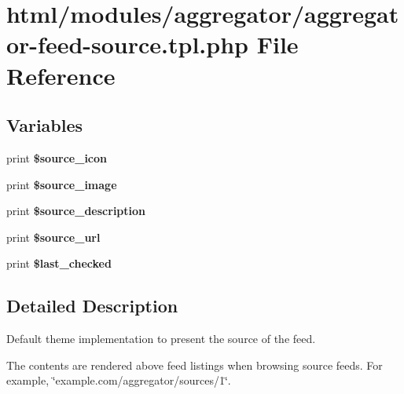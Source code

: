 \hypertarget{aggregator-feed-source_8tpl_8php}{
\section{html/modules/aggregator/aggregator-\/feed-\/source.tpl.php File Reference}
\label{aggregator-feed-source_8tpl_8php}
}
\subsection*{Variables}
\begin{DoxyCompactItemize}
\item 
\hypertarget{aggregator-feed-source_8tpl_8php_ab68bdd58de0c58b7f693392cdaedd0c6}{
print {\bfseries \$source\_\-icon}}
\label{aggregator-feed-source_8tpl_8php_ab68bdd58de0c58b7f693392cdaedd0c6}

\item 
\hypertarget{aggregator-feed-source_8tpl_8php_af295e6279c4277c20165af3ddd0a49fd}{
print {\bfseries \$source\_\-image}}
\label{aggregator-feed-source_8tpl_8php_af295e6279c4277c20165af3ddd0a49fd}

\item 
\hypertarget{aggregator-feed-source_8tpl_8php_a88d3fc892cda0ae2d9785aa1baa64a53}{
print {\bfseries \$source\_\-description}}
\label{aggregator-feed-source_8tpl_8php_a88d3fc892cda0ae2d9785aa1baa64a53}

\item 
\hypertarget{aggregator-feed-source_8tpl_8php_ac28b1457ba0a04cbe629056c40639fd5}{
print {\bfseries \$source\_\-url}}
\label{aggregator-feed-source_8tpl_8php_ac28b1457ba0a04cbe629056c40639fd5}

\item 
\hypertarget{aggregator-feed-source_8tpl_8php_a95e757fc03ab209641c87deba540e3cf}{
print {\bfseries \$last\_\-checked}}
\label{aggregator-feed-source_8tpl_8php_a95e757fc03ab209641c87deba540e3cf}

\end{DoxyCompactItemize}


\subsection{Detailed Description}
Default theme implementation to present the source of the feed.

The contents are rendered above feed listings when browsing source feeds. For example, \char`\"{}example.com/aggregator/sources/1\char`\"{}.


